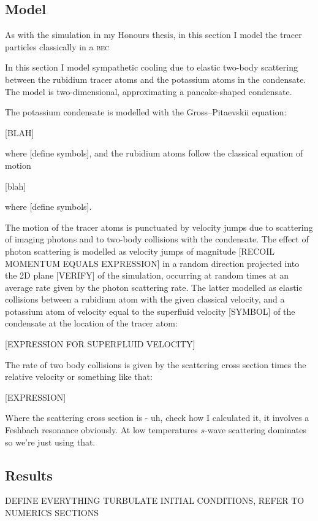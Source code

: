 \subsection{Model}

As with the simulation in my Honours thesis, in this section I model the tracer particles classically in a \textsc{bec}

In this section I model sympathetic cooling due to elastic two-body scattering between the rubidium tracer atoms and the potassium atoms in the condensate. The model is two-dimensional, approximating a pancake-shaped condensate.

The potassium condensate is modelled with the Gross--Pitaevskii equation:

[BLAH]

where [define symbols], and the rubidium atoms follow the classical equation of motion

[blah]

where [define symbols].

The motion of the tracer atoms is punctuated by velocity jumps due to scattering of imaging photons and to two-body collisions with the condensate. The effect of photon scattering is modelled as velocity jumps of magnitude [RECOIL MOMENTUM EQUALS EXPRESSION] in a random direction projected into the 2D plane [VERIFY] of the simulation, occurring at random times at an average rate given by the photon scattering rate. The latter modelled as elastic collisions between a rubidium atom with the given classical velocity, and a potassium atom of velocity equal to the superfluid velocity [SYMBOL] of the condensate at the location of the tracer atom:

[EXPRESSION FOR SUPERFLUID VELOCITY]

The rate of two body collisions is given by the scattering cross section times the relative velocity or something like that:

[EXPRESSION]

Where the scattering cross section is - uh, check how I calculated it, it involves a Feshbach resonance obviously. At low temperatures $s$-wave scattering dominates so we're just using that.


\subsection{Results}

DEFINE EVERYTHING TURBULATE INITIAL CONDITIONS, REFER TO NUMERICS SECTIONS

